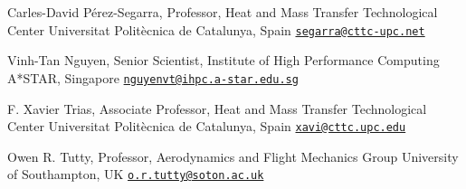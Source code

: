 \documentclass[line]{res}
\newenvironment{p1}
  {\begin{adjustwidth}{-16pt}{0pt}
  \vspace{1pt}}
  {\end{adjustwidth}}
\begin{document}
\begin{resume}
\begin{p1}
Carles-David P\'{e}rez-Segarra, Professor, Heat and Mass Transfer Technological Center\newline
Universitat Polit\`{e}cnica de Catalunya, Spain\newline
\href{mailto:segarra@cttc-upc.net}{\texttt{segarra@cttc-upc.net}}

Vinh-Tan Nguyen, Senior Scientist, Institute of High Performance Computing\newline
A*STAR, Singapore\newline
\href{mailto:nguyenvt@ihpc.a-star.edu.sg}{\texttt{nguyenvt@ihpc.a-star.edu.sg}}

F. Xavier Trias, Associate Professor, Heat and Mass Transfer Technological Center\newline
Universitat Polit\`{e}cnica de Catalunya, Spain\newline
\href{mailto:xavi@cttc.upc.edu}{\texttt{xavi@cttc.upc.edu}}

Owen R. Tutty, Professor, Aerodynamics and Flight Mechanics Group\newline
University of Southampton, UK\newline
\href{mailto:o.r.tutty@soton.ac.uk}{\texttt{o.r.tutty@soton.ac.uk}}
\end{p1}
\end{resume}
\end{document}
